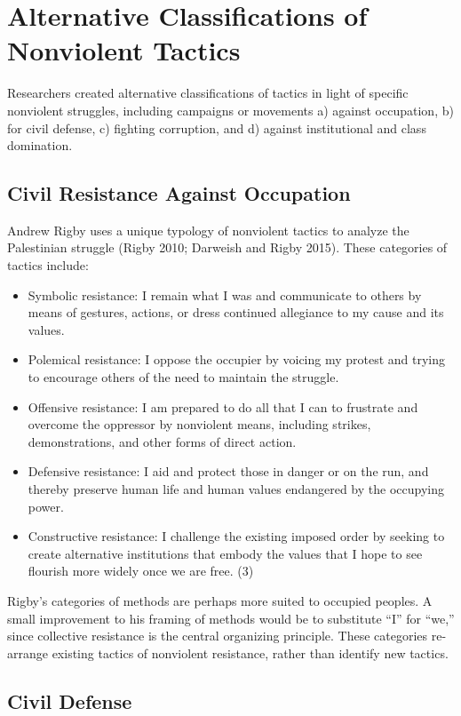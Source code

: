 \documentclass[twoside,a4paper,12pt,fleqn,openany]{extbook}
\begin{document}
\section*{Alternative Classifications of Nonviolent Tactics}

Researchers created alternative classifications of tactics in light of specific nonviolent struggles, including campaigns or movements a) against occupation, b) for civil defense, c) fighting corruption, and d) against institutional and class domination.

\subsection*{Civil Resistance Against Occupation}

Andrew Rigby uses a unique typology of nonviolent tactics to analyze the Palestinian struggle (Rigby 2010; Darweish and Rigby 2015). These categories of tactics include:

\begin{itemize}
\item Symbolic resistance: I remain what I was and communicate to others by means of gestures, actions, or dress continued allegiance to my cause and its values.
\item Polemical resistance: I oppose the occupier by voicing my protest and trying to encourage others of the need to maintain the struggle.
\item Offensive resistance: I am prepared to do all that I can to frustrate and overcome the oppressor by nonviolent means, including strikes, demonstrations, and other forms of direct action.
\item Defensive resistance: I aid and protect those in danger or on the run, and thereby preserve human life and human values endangered by the occupying power.
\item Constructive resistance: I challenge the existing imposed order by seeking to create alternative institutions that embody the values that I hope to see flourish more widely once we are free. (3)
\end{itemize}

Rigby’s categories of methods are perhaps more suited to occupied peoples. A small improvement to his framing of methods would be to substitute “I” for “we,” since collective resistance is the central organizing principle. These categories re-arrange existing tactics of nonviolent resistance, rather than identify new tactics.

\subsection*{Civil Defense}
\end{document}
